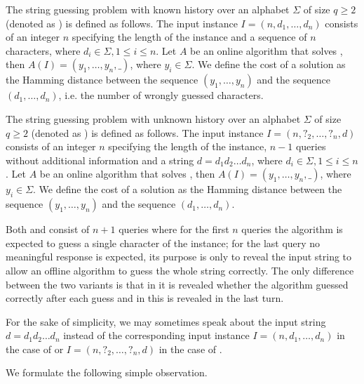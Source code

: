 \begin{definition}
    The string guessing problem with known history over an alphabet
    $\Sigma$ of size $q \geq 2$ (denoted as ) is defined as
    follows. The input instance $I = (n, d_1, \dots, d_n)$ consists of an
    integer $n$ specifying the length of the instance and a sequence of
    $n$ characters, where $d_i \in \Sigma, 1 \leq i \leq n$. Let $A$ be an
    online algorithm that solves , then $A(I) = (y_1, \dots, y_n,
    \_)$, where $y_i \in \Sigma$. We define the cost of a solution as the
    Hamming distance between the sequence $(y_1, \dots, y_n)$ and the
    sequence $(d_1, \dots, d_n)$, i.e. the number of wrongly guessed
    characters.
\end{definition}

\begin{definition}
    The string guessing problem with unknown history over an alphabet
    $\Sigma$ of size $q \geq 2$ (denoted as ) is defined as
    follows. The input instance $I = (n, ?_2, \dots, ?_n, d)$ consists of
    an integer $n$ specifying the length of the instance, $n-1$ queries
    without additional information and a string $d = d_1d_2\dots{}d_n$,
    where $d_i \in \Sigma, 1 \leq i \leq n$. Let $A$ be an online
    algorithm that solves , then $A(I) = (y_1, \dots, y_n, \_)$,
    where $y_i \in \Sigma$. We define the cost of a solution as the
    Hamming distance between the sequence $(y_1, \dots, y_n)$ and the
    sequence $(d_1, \dots, d_n)$.
\end{definition}

Both  and  consist of $n + 1$ queries where for the first
$n$ queries the algorithm is expected to guess a single character of the
instance; for the last query no meaningful response is expected, its
purpose is only to reveal the input string to allow an offline algorithm
to guess the whole string correctly. The only difference between the two
variants is that in  it is revealed whether the algorithm guessed
correctly after each guess and in  this is revealed in the last
turn.

For the sake of simplicity, we may sometimes speak about the input string
$d = d_1d_2\dots{}d_n$ instead of the corresponding input instance $I =
(n, d_1, \dots, d_n)$ in the case of  or $I = (n, ?_2, \dots, ?_n,
d)$ in the case of .

We formulate the following simple observation.

